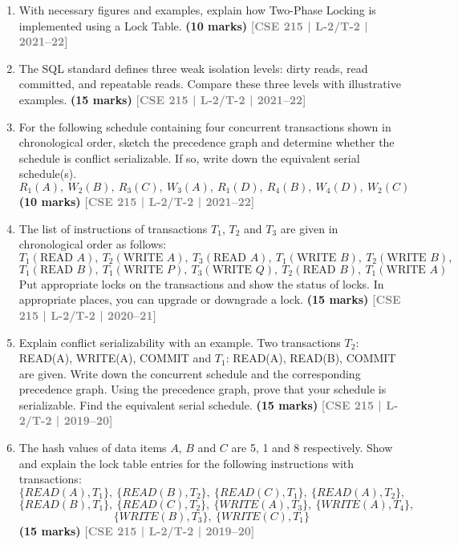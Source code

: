 \documentclass[12pt,a3paper]{article}
\newcommand{\yr}[1]{\hfill\textcolor{gray}{\small\textbf{[#1]}}}
\newcommand{\mk}[1]{\textcolor{orange!70!black}{\small\textbf{(#1 marks)}}}
\begin{document}
\begin{enumerate}
\item With necessary figures and examples, explain how Two-Phase Locking is implemented using a Lock Table.
\mk{10} \yr{CSE 215 | L-2/T-2 | 2021--22}

\item The SQL standard defines three weak isolation levels: dirty reads, read committed, and repeatable reads. Compare these three levels with illustrative examples.
\mk{15} \yr{CSE 215 | L-2/T-2 | 2021--22}

\item For the following schedule containing four concurrent transactions shown in chronological order, sketch the precedence graph and determine whether the schedule is conflict serializable. If so, write down the equivalent serial schedule(s).
\[R_1(A),\ W_2(B),\ R_3(C),\ W_3(A),\ R_1(D),\ R_4(B),\ W_4(D),\ W_2(C)\]
  \mk{10} \yr{CSE 215 | L-2/T-2 | 2021--22}

\item The list of instructions of transactions $T_1$, $T_2$ and $T_3$ are given in chronological order as follows:
\[T_1(\text{READ }A),\ T_2(\text{WRITE }A),\ T_3(\text{READ }A),\ T_1(\text{WRITE }B),\ T_2(\text{WRITE }B),\]
\[T_1(\text{READ }B),\ T_1(\text{WRITE }P),\ T_3(\text{WRITE }Q),\ T_2(\text{READ }B),\ T_1(\text{WRITE }A)\]
Put appropriate locks on the transactions and show the status of locks. In appropriate places, you can upgrade or downgrade a lock.
  \mk{15} \yr{CSE 215 | L-2/T-2 | 2020--21}

\item Explain conflict serializability with an example. Two transactions $T_2$: READ(A), WRITE(A), COMMIT and $T_1$: READ(A), READ(B), COMMIT are given. Write down the concurrent schedule and the corresponding precedence graph. Using the precedence graph, prove that your schedule is serializable. Find the equivalent serial schedule.
\mk{15} \yr{CSE 215 | L-2/T-2 | 2019--20}

\item The hash values of data items $A$, $B$ and $C$ are 5, 1 and 8 respectively. Show and explain the lock table entries for the following instructions with transactions:
\[\{READ(A), T_1\},\ \{READ(B), T_2\},\ \{READ(C), T_1\},\ \{READ(A), T_2\},\]
\[\{READ(B), T_1\},\ \{READ(C), T_2\},\ \{WRITE(A), T_3\},\ \{WRITE(A), T_4\},\]
\[\{WRITE(B), T_3\},\ \{WRITE(C), T_1\}\]
\mk{15} \yr{CSE 215 | L-2/T-2 | 2019--20}


\end{enumerate}
\end{document}
